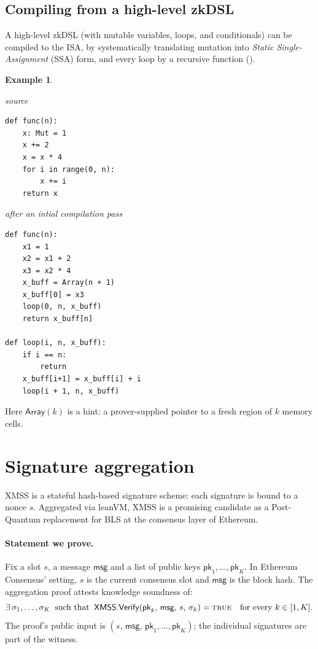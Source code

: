 \documentclass{article}
\theoremstyle{definition}
\newtheorem{exmp}{Example}[section]
\begin{document}
\subsection{Compiling from a high-level zkDSL}\label{sec:zkdsl-to-ssa}

A high-level zkDSL (with mutable variables, loops, and conditionals) can be compiled to the ISA, by systematically translating mutation into \emph{Static Single-Assignment} (SSA) form, and every loop by a recursive function ().

\begin{exmp}
\begin{framed}
\small
\noindent
\begin{minipage}[t]{0.42\textwidth}
\textit{source}
\begin{verbatim}
def func(n):
    x: Mut = 1
    x += 2
    x = x * 4
    for i in range(0, n):
        x += i
    return x
\end{verbatim}
\end{minipage}%
\begin{minipage}[t]{0.46\textwidth}
\textit{after an intial compilation pass}
\begin{verbatim}
def func(n):
    x1 = 1
    x2 = x1 + 2
    x3 = x2 * 4
    x_buff = Array(n + 1)
    x_buff[0] = x3
    loop(0, n, x_buff)
    return x_buff[n]

def loop(i, n, x_buff):
    if i == n:
        return
    x_buff[i+1] = x_buff[i] + i
    loop(i + 1, n, x_buff)
\end{verbatim}
\end{minipage}
\end{framed}
Here $\textsf{Array}(k)$ is a hint: a prover-supplied pointer to a fresh region of $k$ memory cells.
\end{exmp}


\section{Signature aggregation}\label{sec:signature-aggregation}

XMSS \cite{ethereum_signatures} is a stateful hash-based signature scheme: each signature is bound to a nonce $s$. Aggregated via leanVM, XMSS is a promising candidate as a Post-Quantum replacement for BLS \cite{bls} at the consensus layer of Ethereum.

\paragraph{Statement we prove.} Fix a slot $s$, a message $\textsf{msg}$ and a list of public keys $\textsf{pk}_1, \dots, \textsf{pk}_K$. In Ethereum Consensus' setting, $s$ is the current consensus slot and $\textsf{msg}$ is the block hash. The aggregation proof attests knowledge soundness of:
\[
    \exists\, \sigma_1, \dots, \sigma_K \;\;\text{such that}\;\; \textsf{XMSS.Verify}(\textsf{pk}_k,\, \textsf{msg},\, s,\, \sigma_k) = \textsc{true} \quad \text{for every } k \in [1, K].
\]
The proof's public input is $(s,\, \textsf{msg},\, \textsf{pk}_1, \dots, \textsf{pk}_K)$; the individual signatures are part of the witness.
\end{document}
